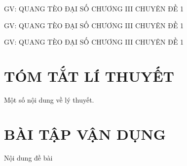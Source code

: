 \begin{name}
	{GV: QUANG TÈO}
	{ĐẠI SỐ CHƯƠNG III CHUYÊN ĐỀ 1}
\end{name}

\begin{nameh}
	{GV: QUANG TÈO}
	{ĐẠI SỐ CHƯƠNG III CHUYÊN ĐỀ 1}
\end{nameh}

\begin{nameb}
	{GV: QUANG TÈO}
	{ĐẠI SỐ CHƯƠNG III CHUYÊN ĐỀ 1}
\end{nameb}

\section{TÓM TẮT LÍ THUYẾT}
\setcounter{ex}{0}\setcounter{bt}{0}

Một số nội dung về lý thuyết.

\section{BÀI TẬP VẬN DỤNG}

\begin{bt}
	Nội dung đề bài
	\loigiai{
	}
\end{bt}
